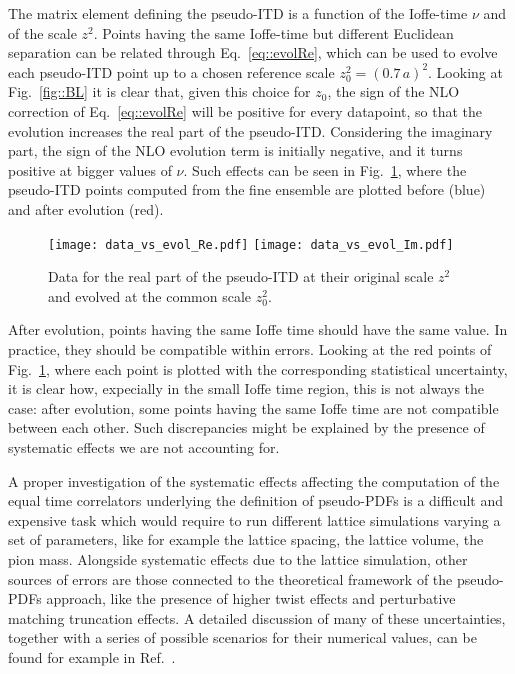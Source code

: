 The matrix element defining the pseudo-ITD is a function of the Ioffe-time $\nu$ and of the scale $z^2$.
Points having the same Ioffe-time but different Euclidean separation can be related through Eq.~\eqref{eq::evolRe}, 
which can be used to evolve each pseudo-ITD point up to a chosen reference scale $z_0 ^2 = \left(0.7\,a\right)^2$.
Looking at Fig.~\ref{fig::BL} it is clear that, given this choice for $z_0$, the sign of the NLO correction 
of Eq.~\eqref{eq::evolRe} will be positive for every datapoint, so that the evolution increases the real part of the pseudo-ITD.
Considering the imaginary part, the sign of the NLO evolution term is initially negative, and it turns positive at bigger values of $\nu$.
Such effects can be seen in Fig.~\ref{fig::evol}, where the pseudo-ITD points computed from the fine ensemble are plotted
before (blue) and after evolution (red). 
\begin{figure}[h!]
    \center
    \texttt{[image: data\_vs\_evol\_Re.pdf]}
    \texttt{[image: data\_vs\_evol\_Im.pdf]}
    \caption{Data for the real part of the pseudo-ITD at their original scale $z^2$ and evolved at the common scale $z_0^2$.}
    \label{fig::evol}
\end{figure}
After evolution, points having the same Ioffe time should have the same value.
In practice, they should be compatible within errors.
Looking at the red points of Fig.~\ref{fig::evol}, where each point is plotted with the corresponding statistical uncertainty, 
it is clear how, expecially in the small Ioffe time region, this is not always the case:
after evolution, some points having the same Ioffe time are not compatible between each other.
Such discrepancies might be explained by the presence of systematic effects we are not accounting for.

% 
A proper investigation of the systematic effects affecting the computation of the equal time correlators underlying
the definition of pseudo-PDFs is a difficult and expensive task which would require to run different lattice simulations 
varying a set of parameters, like for example the lattice spacing, the lattice volume, the pion mass. 
Alongside systematic effects due to the lattice simulation, other sources of errors are those connected 
to the theoretical framework of the pseudo-PDFs approach, like the presence of higher twist effects and perturbative matching truncation effects. 
A detailed discussion of many of these uncertainties, together with a series of possible scenarios for their numerical values, 
can be found for example in Ref.~\cite{Cichy2019}. 

